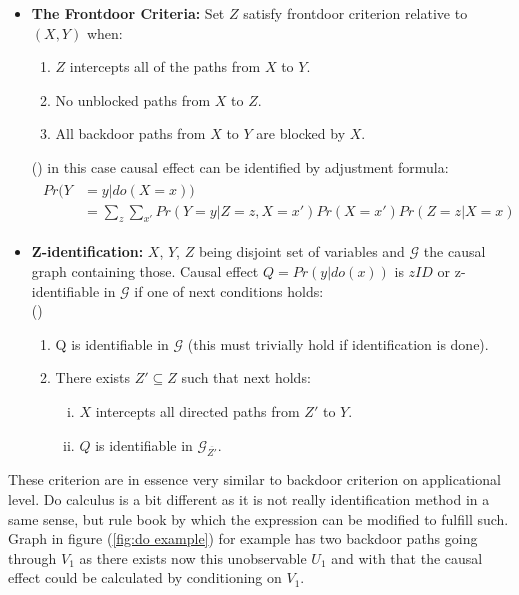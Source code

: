 \documentclass[main=english,12pt,a4paper,pdftex,econ,utf8]{aaltothesis}
\newcommand{\g}{\mathcal{G}}
\begin{document}
\begin{itemize}
    \item[] \textbf{The Frontdoor Criteria:} Set $Z$ satisfy frontdoor criterion relative to $(X,Y)$ when:
    \begin{enumerate}
        \item $Z$ intercepts all of the paths from $X$ to $Y$.
        \item No unblocked paths from $X$ to $Z$.
        \item All backdoor paths from $X$ to $Y$ are blocked by $X$.
    \end{enumerate}
    \vspace{-.2cm}
    (\cite{Pearl2016})
    in this case causal effect can be identified by adjustment formula:
    \begin{align} \label{eq:fd}
        \begin{split}
            Pr(Y&=y|do(X=x)) \\ 
            &=\sum_{z}\sum_{x'}Pr(Y=y|Z=z,X=x')Pr(X=x')Pr(Z=z|X=x)
        \end{split}
    \end{align}
    \item[] \textbf{Z-identification:} $X$, $Y$, $Z$ being disjoint set of variables and $\g$ the causal graph containing those. Causal effect $Q=Pr(y|do(x))$ is $zID$ or z-identifiable in $\g$ if one of next conditions holds: \\
    (\cite{Bareinboim2012})
    \begin{enumerate}
        \item Q is identifiable in $\g$ (this must trivially hold if identification is done).
        \item There exists $Z'\subseteq Z$ such that next holds:
        \begin{enumerate}[i.]
            \item $X$ intercepts all directed paths from $Z'$ to $Y$.
            \item $Q$ is identifiable in $\g_{\overline{Z'}}$.
        \end{enumerate}
    \end{enumerate}
\end{itemize}

These criterion are in essence very similar to backdoor criterion on applicational level. Do calculus is a bit different as it is not really identification method in a same sense, but rule book by which the expression can be modified to fulfill such. Graph in figure (\ref{fig:do example}) for example has two backdoor paths going through $V_{1}$ as there exists now this unobservable $U_1$  and with that the causal effect could be calculated by conditioning on $V_1$.
\end{document}
